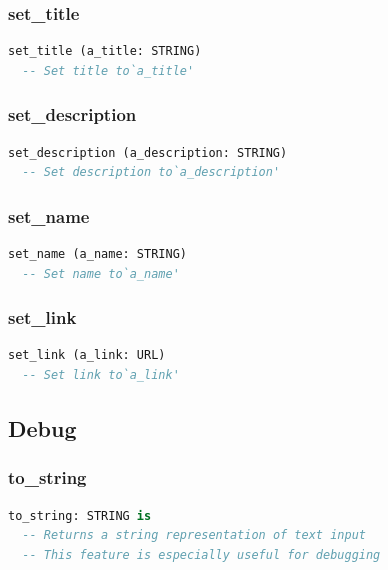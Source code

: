 \subsubsection{set\_title}

\begin{lstlisting}[language=Eiffel]
set_title (a_title: STRING)
  -- Set title to`a_title'
\end{lstlisting}

\subsubsection{set\_description}

\begin{lstlisting}[language=Eiffel]
set_description (a_description: STRING)
  -- Set description to`a_description'
\end{lstlisting}

\subsubsection{set\_name}

\begin{lstlisting}[language=Eiffel]
set_name (a_name: STRING)
  -- Set name to`a_name'
\end{lstlisting}

\subsubsection{set\_link}

\begin{lstlisting}[language=Eiffel]
set_link (a_link: URL)
  -- Set link to`a_link'
\end{lstlisting}

\subsection{Debug}
\label{sec:channel-text-input-debug}

\subsubsection{to\_string}

\begin{lstlisting}[language=Eiffel]
to_string: STRING is
  -- Returns a string representation of text input
  -- This feature is especially useful for debugging
\end{lstlisting}


